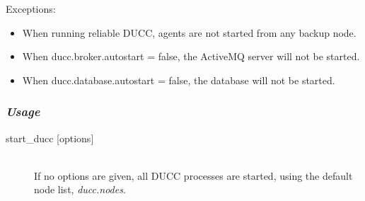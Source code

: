     Exceptions:
    \begin{itemize}
      \item When running reliable DUCC, agents are not started from any backup node.
      \item When ducc.broker.autostart = false, the ActiveMQ server will not be started.
      \item When ducc.database.autostart = false, the database will not be started.
    \end{itemize}

    \subsubsection{{\em Usage}}

    \begin{description}
      \item[start\_ducc {[options]}] \hfill \\ 
        If no options are given, all DUCC processes are started, using the default node list, 
        {\em ducc.nodes}. 
      
      \end{description}
      
